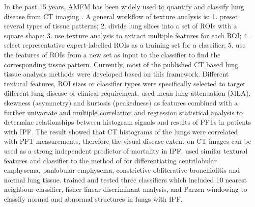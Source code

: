 In the past 15 years, AMFM has been widely used to quantify and classify lung disease from CT imaging \citep{van2002automatic,chabat2003obstructive,best2003quantitative,uchiyama2003quantitative,kim2005computer,zavaletta2006high,arzhaeva2007computer,best2008idiopathic,kim2010computer,kim2011quantitative,kim2015comparison}. A general workflow of texture analysis is: 1. preset several types of tissue patterns; 2. divide lung slices into a set of ROIs with a square shape; 3. use texture analysis to extract multiple features for each ROI; 4. select representative expert-labelled ROIs as a training set for a classifier; 5. use the features of ROIs from a new set as input to the classifier to find the corresponding tissue pattern. Currently, most of the published CT based lung tissue analysis methods were developed based on this framework. Different textural features, ROI sizes or classifier types were specifically selected to target different lung disease or clinical requirement. \cite{best2003quantitative,best2008idiopathic} used mean lung attenuation (MLA), skewness (asymmetry) and kurtosis (peakedness) as features combined with a further univariate and multiple correlation and regression statistical analysis to determine relationships between histogram signals and results of PFTs in patients with IPF. The result showed that CT histograms of the lungs were correlated with PFT measurements, therefore the visual disease extent on CT images can be used as a strong independent predictor of mortality in IPF. \cite{chabat2003obstructive} used similar textural features and classifier to the method of \cite{best2003quantitative,best2008idiopathic} for differentiating centrilobular emphysema, panlobular emphysema, constrictive obliterative bronchiolitis and normal lung tissue. \cite{zavaletta2007high} trained and tested three classifiers which included 10 nearest neighbour classifier, fisher linear discriminant analysis, and Parzen windowing to classify normal and abnormal structures in lungs with IPF. 

